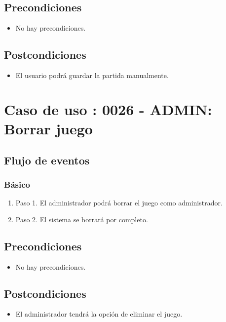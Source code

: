 \subsection{Precondiciones}
\begin{itemize}
\item No hay precondiciones.
\end{itemize}

\subsection{Postcondiciones}
\begin{itemize}
\item El usuario podrá guardar la partida manualmente. 
\end{itemize}



\section{Caso de uso : 0026 - ADMIN: Borrar juego}\label{sec:uc0}
\subsection{Flujo de eventos}
\subsubsection{Básico}

\begin{enumerate}
\item Paso 1.
El administrador podrá borrar el juego como administrador. 
\item Paso 2.
El sistema se borrará por completo. 
\end{enumerate}

\subsection{Precondiciones}
\begin{itemize}
\item No hay precondiciones.
\end{itemize}

\subsection{Postcondiciones}
\begin{itemize}
\item El administrador tendrá la opción de eliminar el juego.
\end{itemize}



